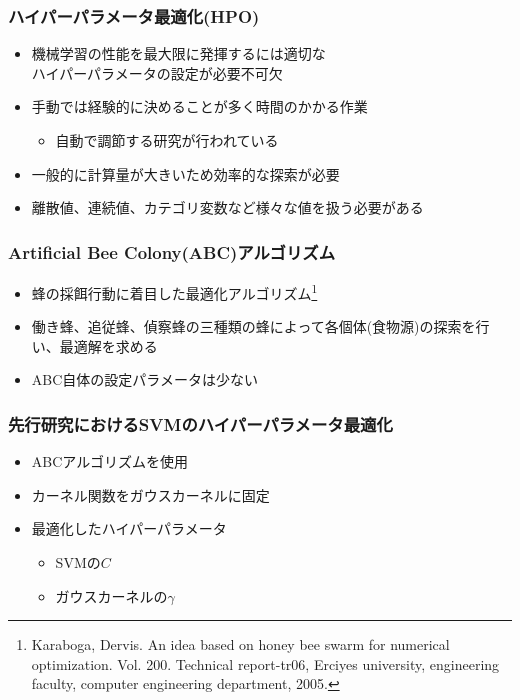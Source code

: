 \documentclass[11pt,dvipdfmx,cjk]{beamer}
\begin{document}
\begin{frame}
    \frametitle{ハイパーパラメータ最適化(HPO)}
    \begin{itemize}
      \item 機械学習の性能を最大限に発揮するには適切な\\ハイパーパラメータの設定が必要不可欠
      \item 手動では経験的に決めることが多く時間のかかる作業
       \begin{itemize}
         \item 自動で調節する研究が行われている
       \end{itemize}
      \item 一般的に計算量が大きいため効率的な探索が必要
      \item 離散値、連続値、カテゴリ変数など様々な値を扱う必要がある
    \end{itemize}
  \end{frame}
  \begin{frame}
    \frametitle{Artificial Bee Colony(ABC)アルゴリズム}
    \begin{itemize}
      \item 蜂の採餌行動に着目した最適化アルゴリズム\footnote{Karaboga, Dervis. An idea based on honey bee swarm for numerical optimization. Vol. 200. Technical report-tr06, Erciyes university, engineering faculty, computer engineering department, 2005.}
      \item 働き蜂、追従蜂、偵察蜂の三種類の蜂によって各個体(食物源)の探索を行い、最適解を求める
      \item ABC自体の設定パラメータは少ない
    \end{itemize}
  \end{frame}
  \begin{frame}
    \frametitle{先行研究におけるSVMのハイパーパラメータ最適化}
    \begin{itemize}
      \item ABCアルゴリズムを使用
      \item カーネル関数をガウスカーネルに固定
      \item 最適化したハイパーパラメータ
      \begin{itemize}
        \item SVMの$C$
        \item ガウスカーネルの$\gamma$
      \end{itemize}
    \end{itemize}
\end{frame}
\end{document}
